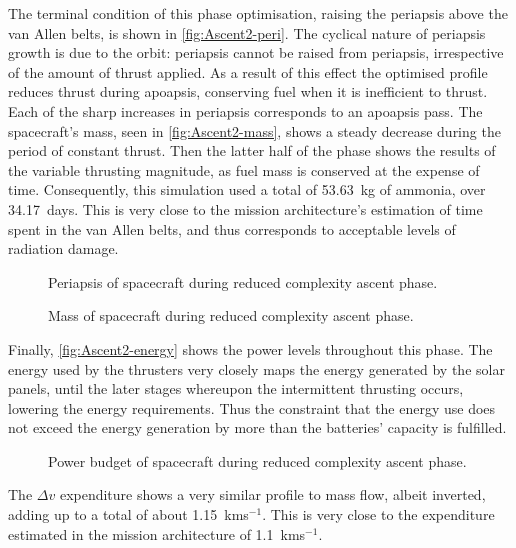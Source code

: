 The terminal condition of this phase optimisation, raising the periapsis above the van Allen belts, is shown in \autoref{fig:Ascent2-peri}. The cyclical nature of periapsis growth is due to the orbit: periapsis cannot be raised from periapsis, irrespective of the amount of thrust applied. As a result of this effect the optimised profile reduces thrust during apoapsis, conserving fuel when it is inefficient to thrust. Each of the sharp increases in periapsis corresponds to an apoapsis pass. The spacecraft's mass, seen in \autoref{fig:Ascent2-mass}, shows a steady decrease during the period of constant thrust. Then the latter half of the phase shows the results of the variable thrusting magnitude, as fuel mass is conserved at the expense of time. Consequently, this simulation used a total of 53.63~kg of ammonia, over 34.17~days. This is very close to the mission architecture's estimation of time spent in the van Allen belts, and thus corresponds to acceptable levels of radiation damage.

\begin{figure}
\caption{Periapsis of spacecraft during reduced complexity ascent phase.} \label{fig:Ascent2-peri}
\centering
\def\svgwidth{\figurewidth}

\end{figure}

\begin{figure}
\caption{Mass of spacecraft during reduced complexity ascent phase.} \label{fig:Ascent2-mass}
\centering
\def\svgwidth{\figurewidth}

\end{figure}

Finally, \autoref{fig:Ascent2-energy} shows the power levels throughout this phase. The energy used by the thrusters very closely maps the energy generated by the solar panels, until the later stages whereupon the intermittent thrusting occurs, lowering the energy requirements. Thus the constraint that the energy use does not exceed the energy generation by more than the batteries' capacity is fulfilled.

\begin{figure}
\caption{Power budget of spacecraft during reduced complexity ascent phase.} \label{fig:Ascent2-energy}
\centering
\def\svgwidth{\figurewidth}

\end{figure}

The $\Delta v$ expenditure shows a very similar profile to mass flow, albeit inverted, adding up to a total of about 1.15~kms$^{-1}$. This is very close to the expenditure estimated in the mission architecture of 1.1~kms$^{-1}$.


